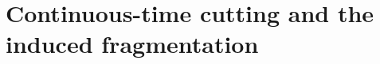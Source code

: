 \documentclass[11pt]{article}
\begin{document}
%


\section{Continuous-time cutting and the induced fragmentation}
\label{sec:cutting}



\end{document}
